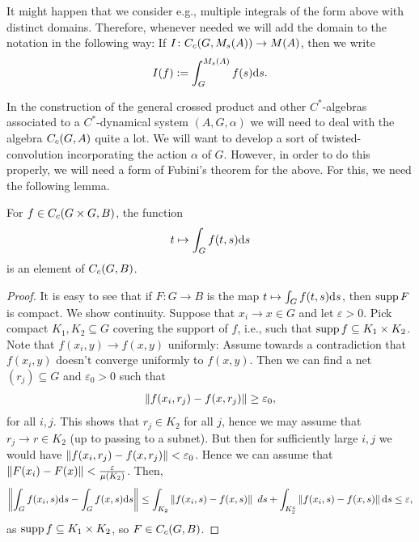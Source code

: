 It might happen that we consider e.g., multiple integrals of the form above with distinct domains. Therefore, whenever needed we will add the domain to the notation in the following way: If $I \colon C_c(G,M_s(A)) \to M(A)$, then we write
\begin{align*}
	I(f) :=\int_G^{M_s(A)} f(s) \mathrm{d} s.
\end{align*}

In the construction of the general crossed product and other $C^*$-algebras associated to a $C^*$-dynamical system $(A,G,\alpha)$ we will need to deal with the algebra $C_c(G,A)$ quite a lot. We will want to develop a sort of twisted-convolution incorporating the action $\alpha$ of $G$. However, in order to do this properly, we will need a form of Fubini's theorem for the above. For this, we need the following lemma.
\begin{lemma}
For $f \in C_c(G \times G  , B)$, the function
\begin{align*}
	t \mapsto \int_G f(t,s) \mathrm{d} s
\end{align*}
is an element of $C_c(G,B)$.
\label{int:singleint}
\end{lemma}
\begin{proof}
It is easy to see that if $F \colon G \to B$ is the map $t \mapsto \int_G f(t,s) \mathrm{d} s$, then $ \operatorname{supp} F$ is compact. We show continuity. Suppose that $x_i \to x \in G$ and let $ \varepsilon > 0$. Pick compact $K_1,K_2 \subseteq G$ covering the support of $f$, i.e., such that $ \operatorname{supp} f \subseteq K_1 \times K_2$. Note that $f(x_i,y) \to f(x,y)$ uniformly: Assume towards a contradiction that $f(x_i,y)$ doesn't converge uniformly to $f(x,y)$. Then we can find a net $(r_j)\subseteq G$ and $\varepsilon_0 > 0$ such that
\begin{align*}
	\left\lVert f(x_i,r_j) - f(x,r_j) \right\rVert \geq \varepsilon_0,
\end{align*}
for all $i,j$. This shows that $r_j \in K_2$ for all $j$, hence we may assume that $r_j \to r \in K_2$ (up to passing to a subnet). But then for sufficiently large $i,j$ we would have $\left\lVert f(x_i,r_j) - f(x,r_j) \right\rVert < \varepsilon_0$. Hence we can assume that $\left\lVert F(x_i) - F(x) \right\rVert < \frac{\varepsilon}{ \mu(K_2)}$. Then, 
\begin{align*}
	\left\lVert \int_G f(x_i,s) \mathrm{d} s - \int_G f(x,s) \mathrm{d} s \right\rVert \leq \int_{K_2} \left\lVert f(x_i,s) - f(x,s) \right\rVert \ d s + \int_{K_2^c} \left\lVert f(x_i,s) - f(x,s) \right\rVert \mathrm{d} s  \leq \varepsilon,
\end{align*}
as $\operatorname{supp} f \subseteq K_1 \times K_2$, so $F \in C_c(G,B)$.
\end{proof}
